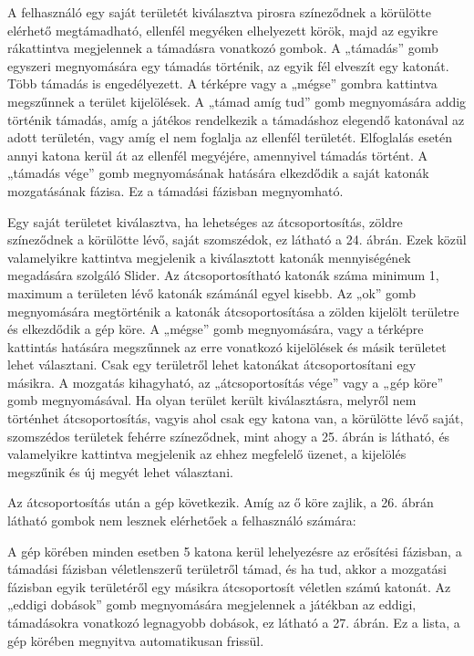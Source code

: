  


A felhasználó egy saját területét kiválasztva pirosra színeződnek a körülötte elérhető megtámadható, ellenfél megyéken elhelyezett körök, majd az egyikre rákattintva megjelennek a támadásra vonatkozó gombok. A „támadás” gomb egyszeri megnyomására egy támadás történik, az egyik fél elveszít egy katonát. Több támadás is engedélyezett. A térképre vagy a „mégse” gombra kattintva megszűnnek a terület kijelölések. A „támad amíg tud” gomb megnyomására addig történik támadás, amíg a játékos rendelkezik a támadáshoz elegendő katonával az adott területén, vagy amíg el nem foglalja az ellenfél területét. Elfoglalás esetén annyi katona kerül át az ellenfél megyéjére, amennyivel támadás történt. A „támadás vége” gomb megnyomásának hatására elkezdődik a saját katonák mozgatásának fázisa. Ez a támadási fázisban megnyomható. 

 



Egy saját területet kiválasztva, ha lehetséges az átcsoportosítás, zöldre színeződnek a körülötte lévő, saját szomszédok, ez látható a 24. ábrán. Ezek közül valamelyikre kattintva megjelenik a kiválasztott katonák mennyiségének megadására szolgáló Slider. Az átcsoportosítható katonák száma minimum 1, maximum a területen lévő katonák számánál egyel kisebb. Az „ok” gomb megnyomására megtörténik a katonák átcsoportosítása a zölden kijelölt területre és elkezdődik a gép köre. A „mégse” gomb megnyomására, vagy a térképre kattintás hatására megszűnnek az erre vonatkozó kijelölések és másik területet lehet választani. Csak egy területről lehet katonákat átcsoportosítani egy másikra. A mozgatás kihagyható, az „átcsoportosítás vége” vagy a „gép köre” gomb megnyomásával. Ha olyan terület került kiválasztásra, melyről nem történhet átcsoportosítás, vagyis ahol csak egy katona van, a körülötte lévő saját, szomszédos területek fehérre színeződnek, mint ahogy a 25. ábrán is látható, és valamelyikre kattintva megjelenik az ehhez megfelelő üzenet, a kijelölés megszűnik és új megyét lehet választani.  

 



Az átcsoportosítás után a gép következik. Amíg az ő köre zajlik, a 26. ábrán látható gombok nem lesznek elérhetőek a felhasználó számára: 

 


A gép körében minden esetben 5 katona kerül lehelyezésre az erősítési fázisban, a támadási fázisban véletlenszerű területről támad, és ha tud, akkor a mozgatási fázisban egyik területéről egy másikra átcsoportosít véletlen számú katonát. Az „eddigi dobások” gomb megnyomására megjelennek a játékban az eddigi, támadásokra vonatkozó legnagyobb dobások, ez látható a 27. ábrán. Ez a lista, a gép körében megnyitva automatikusan frissül. 


